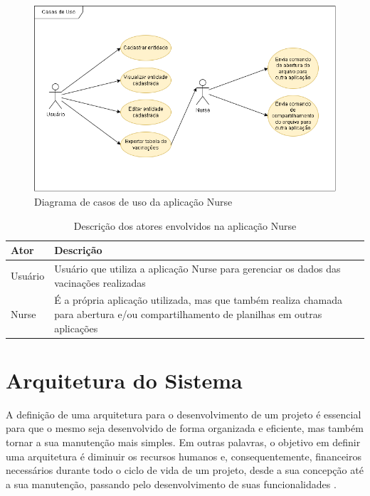\begin{figure}[!ht]
  \centering
  \includegraphics[width=\textwidth]{figuras/cap4/4_1_3_use_cases.png}
  \caption{Diagrama de casos de uso da aplicação Nurse}
  \label{fig:casos_de_uso}
\end{figure}

\begin{table}[ht!]
  \centering
  {
  \begin{tabularx}{\textwidth}{
    | >{\centering\arraybackslash}m{} 
    | >{\centering\arraybackslash}X |}
    \hline
    \rowcolor{green!100}
    \textbf{Ator} & \textbf{Descrição} \\ \hline \hline
    Usuário & Usuário que utiliza a aplicação Nurse para gerenciar os dados das vacinações realizadas \\ \hline
    Nurse & É a própria aplicação utilizada, mas que também realiza chamada para abertura e/ou compartilhamento de planilhas em outras aplicações \\ \hline
  \end{tabularx}}
\caption{Descrição dos atores envolvidos na aplicação Nurse}
\label{tab:actors}
\end{table}

\section{Arquitetura do Sistema}
\label{cap4:Sec:ArquiteturaSistema}

A definição de uma arquitetura para o desenvolvimento de um projeto é essencial para que o mesmo seja desenvolvido de forma organizada e eficiente, mas também tornar a sua manutenção mais simples. Em outras palavras, o objetivo em definir uma arquitetura é diminuir os recursos humanos e, consequentemente, financeiros necessários durante todo o ciclo de vida de um projeto, desde a sua concepção até a sua manutenção, passando pelo desenvolvimento de suas funcionalidades \cite{martin2019arquitetura}. 

